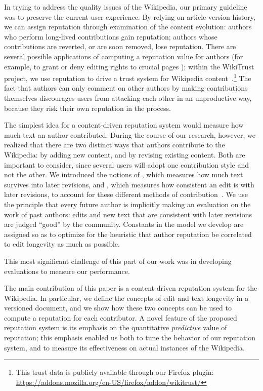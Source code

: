 In trying to address the quality issues of the Wikipedia,
our primary guideline was to preserve the current user experience.
By relying on article version history, we can assign reputation
through examination of the content evolution:
authors who perform long-lived contributions gain reputation; authors
whose contributions are reverted, or are soon removed, lose reputation.
There are several possible applications of computing a reputation
value for authors (for example, to grant or deny editing rights to
crucial pages \cite{Blaze96}); within the WikiTrust project,
we use reputation to drive a trust system for
Wikipedia content~\cite{WikiTrust2008}.\footnote{This trust data
is publicly available through our Firefox plugin:
\url{https://addons.mozilla.org/en-US/firefox/addon/wikitrust/}}
The fact that authors can only comment on other authors by
making contributions themselves discourages users from attacking
each other in an unproductive way, because they risk their own reputation in the process.


The simplest idea for a content-driven reputation system would measure
how much text an author contributed.
During the course of our research, however, we realized that there are
two distinct ways that authors contribute to the Wikipedia: by adding
new content, and by revising existing content.
Both are important to consider, since several users will
adopt one contribution style and not the other.
We introduced the notions of
, which measures how much text survives
into later revisions, and , which measures
how consistent an edit is with later revisions,
to account for these different methods of contribution~\cite{Adler2007}.
We use the principle that every future author is
implicitly making an evaluation on the work of past authors:
edits and new text that are consistent with later revisions
are judged ``good'' by the community.
Constants in the model we develop are assigned so as to optimize
for the heuristic that author reputation
be correlated to edit longevity as much as possible.

This most significant challenge of this part of our work
was in developing evaluations to measure our performance.

The main contribution of this paper is a content-driven reputation
system for the Wikipedia. 
In particular, we define the concepts of edit and text longevity in a
versioned document, and we show how these two concepts can be used to
compute a reputation for each contributor. 
A novel feature of the proposed reputation system is its emphasis on
the quantitative {\em predictive\/} value of reputation; this emphasis
enabled us both to tune the behavior of our reputation system, and to
measure its effectiveness on actual instances of the Wikipedia. 

